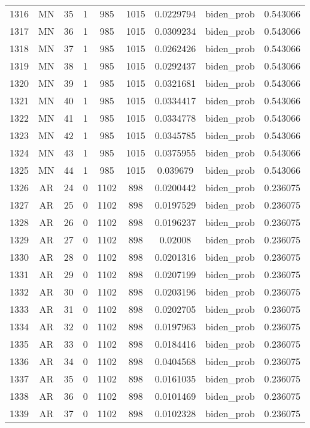 \documentclass[12pt,a4paper]{article}
\begin{document}
\begin{tabular}{r|cccccccc}
	1316 & MN & 35 & 1 & 985 & 1015 & 0.0229794 & biden\_prob & 0.543066 \\
	1317 & MN & 36 & 1 & 985 & 1015 & 0.0309234 & biden\_prob & 0.543066 \\
	1318 & MN & 37 & 1 & 985 & 1015 & 0.0262426 & biden\_prob & 0.543066 \\
	1319 & MN & 38 & 1 & 985 & 1015 & 0.0292437 & biden\_prob & 0.543066 \\
	1320 & MN & 39 & 1 & 985 & 1015 & 0.0321681 & biden\_prob & 0.543066 \\
	1321 & MN & 40 & 1 & 985 & 1015 & 0.0334417 & biden\_prob & 0.543066 \\
	1322 & MN & 41 & 1 & 985 & 1015 & 0.0334778 & biden\_prob & 0.543066 \\
	1323 & MN & 42 & 1 & 985 & 1015 & 0.0345785 & biden\_prob & 0.543066 \\
	1324 & MN & 43 & 1 & 985 & 1015 & 0.0375955 & biden\_prob & 0.543066 \\
	1325 & MN & 44 & 1 & 985 & 1015 & 0.039679 & biden\_prob & 0.543066 \\
	1326 & AR & 24 & 0 & 1102 & 898 & 0.0200442 & biden\_prob & 0.236075 \\
	1327 & AR & 25 & 0 & 1102 & 898 & 0.0197529 & biden\_prob & 0.236075 \\
	1328 & AR & 26 & 0 & 1102 & 898 & 0.0196237 & biden\_prob & 0.236075 \\
	1329 & AR & 27 & 0 & 1102 & 898 & 0.02008 & biden\_prob & 0.236075 \\
	1330 & AR & 28 & 0 & 1102 & 898 & 0.0201316 & biden\_prob & 0.236075 \\
	1331 & AR & 29 & 0 & 1102 & 898 & 0.0207199 & biden\_prob & 0.236075 \\
	1332 & AR & 30 & 0 & 1102 & 898 & 0.0203196 & biden\_prob & 0.236075 \\
	1333 & AR & 31 & 0 & 1102 & 898 & 0.0202705 & biden\_prob & 0.236075 \\
	1334 & AR & 32 & 0 & 1102 & 898 & 0.0197963 & biden\_prob & 0.236075 \\
	1335 & AR & 33 & 0 & 1102 & 898 & 0.0184416 & biden\_prob & 0.236075 \\
	1336 & AR & 34 & 0 & 1102 & 898 & 0.0404568 & biden\_prob & 0.236075 \\
	1337 & AR & 35 & 0 & 1102 & 898 & 0.0161035 & biden\_prob & 0.236075 \\
	1338 & AR & 36 & 0 & 1102 & 898 & 0.0101469 & biden\_prob & 0.236075 \\
	1339 & AR & 37 & 0 & 1102 & 898 & 0.0102328 & biden\_prob & 0.236075 \\

\end{tabular}
\end{document}
